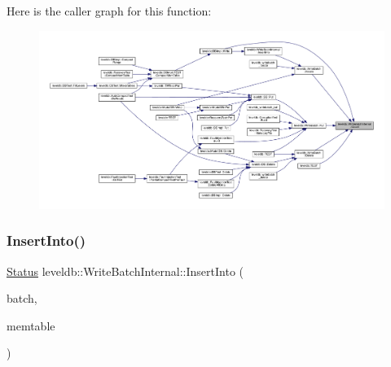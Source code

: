 Here is the caller graph for this function\+:
\nopagebreak
\begin{figure}[H]
\begin{center}
\leavevmode
\includegraphics[width=350pt]{classleveldb_1_1_write_batch_internal_a5270ca4567dbae1524005ad14e0698e3_icgraph}
\end{center}
\end{figure}
\mbox{\label{classleveldb_1_1_write_batch_internal_a102aae14259fd277e2576338ce3e5551}} 
\subsubsection{\texorpdfstring{InsertInto()}{InsertInto()}}
{\footnotesize\ttfamily \mbox{\hyperlink{classleveldb_1_1_status}{Status}} leveldb\+::\+Write\+Batch\+Internal\+::\+Insert\+Into (\begin{DoxyParamCaption}\item[{const \mbox{\hyperlink{classleveldb_1_1_write_batch}{Write\+Batch}} $\ast$}]{batch,  }\item[{\mbox{\hyperlink{classleveldb_1_1_mem_table}{Mem\+Table}} $\ast$}]{memtable }\end{DoxyParamCaption})\hspace{0.3cm}{\ttfamily [static]}}

